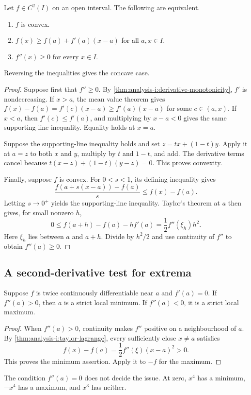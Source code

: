 \begin{proposition}
  \label{thm:analysis-i:convex-second-derivative}
  Let $f\in C^2(I)$ on an open interval. The following are equivalent.
  \begin{enumerate}
    \item $f$ is convex.
    \item $f(x)\ge f(a)+f'(a)(x-a)$ for all $a,x\in I$.
    \item $f''(x)\ge0$ for every $x\in I$.
  \end{enumerate}
  Reversing the inequalities gives the concave case.
\end{proposition}
\begin{proof}
  Suppose first that $f''\ge0$. By
  \autoref{thm:analysis-i:derivative-monotonicity}, $f'$ is nondecreasing.
  If $x>a$, the mean value theorem gives
  $f(x)-f(a)=f'(c)(x-a)\ge f'(a)(x-a)$ for some $c\in(a,x)$.
  If $x<a$, then $f'(c)\le f'(a)$, and multiplying by $x-a<0$
  gives the same supporting-line inequality. Equality holds at $x=a$.

  Suppose the supporting-line inequality holds and set $z=tx+(1-t)y$.
  Apply it at $a=z$ to both $x$ and $y$, multiply by $t$ and $1-t$,
  and add. The derivative terms cancel because
  $t(x-z)+(1-t)(y-z)=0$. This proves convexity.

  Finally, suppose $f$ is convex. For $0<s<1$, its defining inequality
  gives
  \[
    \frac{f(a+s(x-a))-f(a)}s\le f(x)-f(a).
  \]
  Letting $s\to0^+$ yields the supporting-line inequality. Taylor's
  theorem at $a$ then gives, for small nonzero $h$,
  \[
    0\le f(a+h)-f(a)-hf'(a)=\frac12 f''(\xi_h)h^2.
  \]
  Here $\xi_h$ lies between $a$ and $a+h$. Divide by $h^2/2$ and use
  continuity of $f''$ to obtain $f''(a)\ge0$.
\end{proof}

\subsection{A second-derivative test for extrema}
\begin{proposition}
  \label{thm:analysis-i:second-derivative-extremum}
  Suppose $f$ is twice continuously differentiable near $a$ and
  $f'(a)=0$. If $f''(a)>0$, then $a$ is a strict local minimum.
  If $f''(a)<0$, it is a strict local maximum.
\end{proposition}
\begin{proof}
  When $f''(a)>0$, continuity makes $f''$ positive on a neighbourhood
  of $a$. By \autoref{thm:analysis-i:taylor-lagrange}, every sufficiently
  close $x\ne a$ satisfies
  \[
    f(x)-f(a)=\frac12 f''(\xi)(x-a)^2>0.
  \]
  This proves the minimum assertion. Apply it to $-f$ for the maximum.
\end{proof}
The condition $f''(a)=0$ does not decide the issue. At zero, $x^4$
has a minimum, $-x^4$ has a maximum, and $x^3$ has neither.

